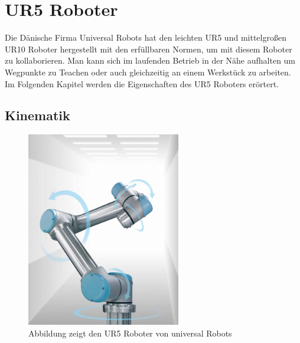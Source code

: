 \section{UR5 Roboter}
\label{sec:ur_robot_gru}

Die Dänische Firma Universal Robots hat den leichten UR5 und mittelgroßen UR10 Roboter hergestellt mit den erfüllbaren Normen, um mit diesem Roboter zu kollaborieren. Man kann sich im laufenden Betrieb in der Nähe aufhalten um Wegpunkte zu Teachen oder auch gleichzeitig an einem Werkstück zu arbeiten. 
Im Folgenden Kapitel werden die Eigenschaften des UR5 Roboters erörtert.

\subsection{Kinematik}
\label{ur_eigenschaften_gru}

\begin{figure}[ht]
  \centering
    \includegraphics[width=0.6\textwidth]{pic/ur5_robot.png}
      \caption[UR5 Roboter]{Abbildung zeigt den UR5 Roboter von universal Robots}
      \label{fig:schnittstellen_schichten}
\end{figure}

